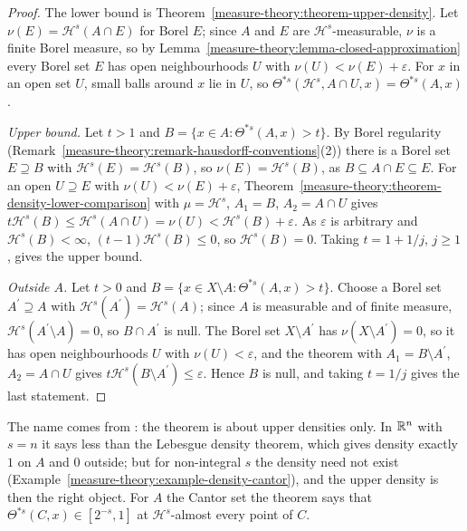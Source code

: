 \begin{proof}
The lower bound is Theorem~\ref{measure-theory:theorem-upper-density}. Let $\nu(E) = \mathcal{H}^s(A \cap E)$ for Borel $E$; since $A$ and $E$ are $\mathcal{H}^s$-measurable, $\nu$ is a finite Borel measure, so
by Lemma~\ref{measure-theory:lemma-closed-approximation} every Borel set $E$ has open neighbourhoods $U$ with $\nu(U) < \nu(E) + \varepsilon$. For $x$ in an open set $U$, small balls around $x$ lie in $U$, so
$\Theta^{*s}(\mathcal{H}^s, A \cap U, x) = \Theta^{*s}(A, x)$.

\emph{Upper bound.} Let $t > 1$ and $B = \{x \in A : \Theta^{*s}(A, x) > t\}$. By Borel regularity (Remark~\ref{measure-theory:remark-hausdorff-conventions}(2)) there is a Borel set $E \supseteq B$ with
$\mathcal{H}^s(E) = \mathcal{H}^s(B)$, so $\nu(E) = \mathcal{H}^s(B)$, as $B \subseteq A \cap E \subseteq E$. For an open $U \supseteq E$ with $\nu(U) < \nu(E) + \varepsilon$,
Theorem~\ref{measure-theory:theorem-density-lower-comparison} with $\mu = \mathcal{H}^s$, $A_1 = B$, $A_2 = A \cap U$ gives $t\mathcal{H}^s(B) \leq \mathcal{H}^s(A \cap U) = \nu(U) < \mathcal{H}^s(B) + \varepsilon$. As
$\varepsilon$ is arbitrary and $\mathcal{H}^s(B) < \infty$, $(t - 1)\mathcal{H}^s(B) \leq 0$, so $\mathcal{H}^s(B) = 0$. Taking $t = 1 + 1/j$, $j \geq 1$, gives the upper bound.

\emph{Outside $A$.} Let $t > 0$ and $B = \{x \in X \setminus A : \Theta^{*s}(A, x) > t\}$. Choose a Borel set $A^{\prime} \supseteq A$ with $\mathcal{H}^s(A^{\prime}) = \mathcal{H}^s(A)$; since $A$ is measurable and of finite
measure, $\mathcal{H}^s(A^{\prime} \setminus A) = 0$, so $B \cap A^{\prime}$ is null. The Borel set $X \setminus A^{\prime}$ has $\nu(X \setminus A^{\prime}) = 0$, so it has open neighbourhoods $U$ with $\nu(U) < \varepsilon$, and
the theorem with $A_1 = B \setminus A^{\prime}$, $A_2 = A \cap U$ gives $t\mathcal{H}^s(B \setminus A^{\prime}) \leq \varepsilon$. Hence $B$ is null, and taking $t = 1/j$ gives the last statement.
\end{proof}

The name comes from \cite{simon-gmt}: the theorem is about upper densities only. In $\mathbb{R}^n$ with $s = n$ it says less than the Lebesgue density theorem, which gives density exactly $1$ on $A$ and $0$
outside; but for non-integral $s$ the density need not exist (Example~\ref{measure-theory:example-density-cantor}), and the upper density is then the right object. For $A$ the Cantor set the theorem
says that $\Theta^{*s}(C, x) \in [2^{-s}, 1]$ at $\mathcal{H}^s$-almost every point of $C$.


